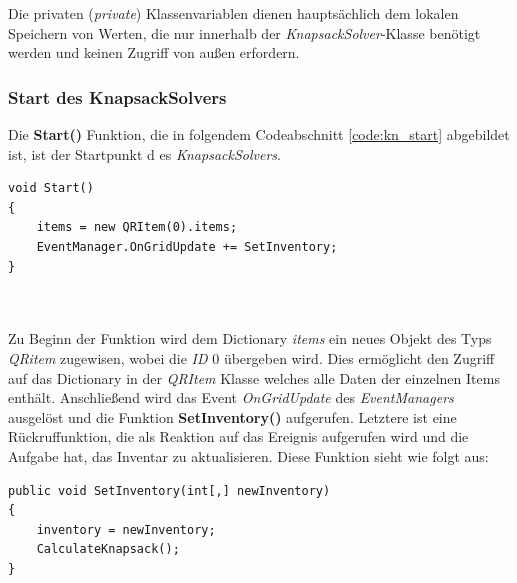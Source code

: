 Die privaten (\textit{private}) Klassenvariablen dienen hauptsächlich dem lokalen Speichern von Werten, die nur innerhalb
der \textit{KnapsackSolver}-Klasse benötigt werden und keinen Zugriff von außen erfordern.

\subsubsection{Start des KnapsackSolvers}
Die \textbf{Start()} Funktion, die in folgendem Codeabschnitt \ref{code:kn_start} abgebildet ist, ist der Startpunkt d
es \textit{KnapsackSolvers}.

\begin{lstlisting}[style=csharp, caption={Klassenvariablen der InventoryController Klasse}, label=code:kn_start]
void Start()
{
    items = new QRItem(0).items;
    EventManager.OnGridUpdate += SetInventory;
}
\end{lstlisting}\\
\\
Zu Beginn der Funktion wird dem Dictionary \textit{items} ein neues Objekt des Typs \textit{QRitem} zugewisen, wobei die
\textit{ID} 0 übergeben wird. Dies ermöglicht den Zugriff auf das Dictionary in der \textit{QRItem} Klasse welches alle
Daten der einzelnen Items enthält. Anschließend wird das Event \textit{OnGridUpdate} des \textit{EventManagers} ausgelöst
und die Funktion \textbf{SetInventory()} aufgerufen. Letztere ist eine Rückruffunktion, die als Reaktion auf das Ereignis
aufgerufen wird und die Aufgabe hat, das Inventar zu aktualisieren. Diese Funktion sieht wie folgt aus:
\begin{lstlisting}[style=csharp, caption={Inventar setzen}, label=code:kn_start]
public void SetInventory(int[,] newInventory)
{
    inventory = newInventory;
    CalculateKnapsack();
}
\end{lstlisting}


